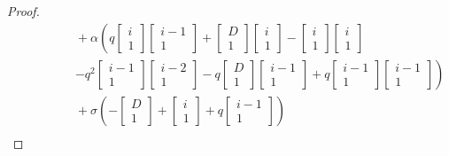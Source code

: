 \documentclass[
]{book}
\theoremstyle{definition}
\theoremstyle{definition}
\theoremstyle{definition}
\theoremstyle{definition}
\theoremstyle{remark}
\begin{document}
\begin{proof}
\begin{align}
& \qquad\qquad + \alpha\left(q\begin{bmatrix}{i}\\{1}\end{bmatrix}\begin{bmatrix}{i-1}\\{1}\end{bmatrix}+\begin{bmatrix}{D}\\{1}\end{bmatrix}\begin{bmatrix}{i}\\{1}\end{bmatrix}-\begin{bmatrix}{i}\\{1}\end{bmatrix}\begin{bmatrix}{i}\\{1}\end{bmatrix}\right.\\
& \qquad\qquad \left.-q^2\begin{bmatrix}{i-1}\\{1}\end{bmatrix}\begin{bmatrix}{i-2}\\{1}\end{bmatrix}-q\begin{bmatrix}{D}\\{1}\end{bmatrix}\begin{bmatrix}{i-1}\\{1}\end{bmatrix}+q\begin{bmatrix}{i-1}\\{1}\end{bmatrix}\begin{bmatrix}{i-1}\\{1}\end{bmatrix}\right)\\
& \qquad\qquad + \sigma\left(-\begin{bmatrix}{D}\\{1}\end{bmatrix}+\begin{bmatrix}{i}\\{1}\end{bmatrix} + q\begin{bmatrix}{i-1}\\{1}\end{bmatrix}\right)\\

\end{align}
\end{proof}
\end{document}
